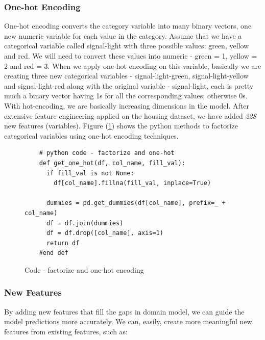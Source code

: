 \documentclass[sigconf]{acmart}
\begin{document}
	\subsubsection{One-hot Encoding}
	 One-hot encoding converts the category variable into many binary vectors, one new numeric variable for each value in the category. Assume that we have a categorical variable called signal-light with three possible values: green, yellow and red. We will need to convert these values into numeric - green = 1, yellow = 2 and red = 3. When we apply one-hot encoding on this variable, basically we are creating three new categorical variables - signal-light-green, signal-light-yellow and signal-light-red along with the original variable - signal-light, each is pretty much a binary vector having 1s for all the corresponding values; otherwise 0s. With hot-encoding, we are basically increasing dimensions in the model. After extensive feature engineering applied on the housing dataset, we have added {\em 228} new features (variables). Figure (\ref{c:code-one-hot}) shows the python methods to factorize categorical variables using one-hot encoding techniques. 
	
	\begin{figure}[htb]	
	\begin{verbatim}	
	# python code - factorize and one-hot
	def get_one_hot(df, col_name, fill_val):
	  if fill_val is not None:
	    df[col_name].fillna(fill_val, inplace=True)
	
	  dummies = pd.get_dummies(df[col_name], prefix=_ + col_name)
	  df = df.join(dummies)
	  df = df.drop([col_name], axis=1)
	  return df
	#end def	

	\end{verbatim}
	\caption{Code - factorize and one-hot encoding} \label{c:code-one-hot} 
	\end{figure}

	\subsubsection{New Features}
	By adding new features that fill the gaps in domain model, we can guide the model predictions more accurately. We can, easily, create more meaningful new features from existing features, such as:
	
\end{document}
